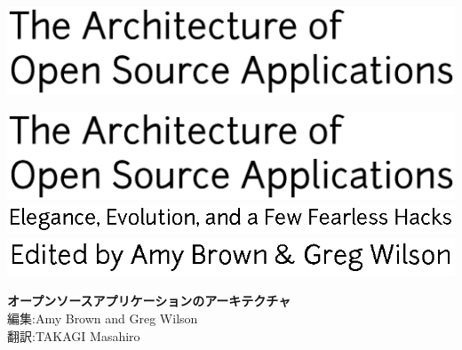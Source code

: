 \newpage

\thispagestyle{empty}
\hspace{-2cm}\includegraphics[width=400pt]{../images/frontmatter/title.eps} 

\newpage

\thispagestyle{empty}
\mbox{}    %

\newpage

\thispagestyle{empty}
\hspace{-2cm}\includegraphics[width=400pt]{../images/frontmatter/title.eps} 
\\
\vspace{0.5cm}
\hspace{2.8cm}\includegraphics{../images/frontmatter/subtitle.eps}
\\[13.5cm]
\vspace{0.5cm}
\hspace{6.5cm}\includegraphics{../images/frontmatter/eds.eps}

\newpage

\thispagestyle{empty}

\small
\noindent \textbf{オープンソースアプリケーションのアーキテクチャ} \\
編集:Amy Brown and Greg Wilson \\
翻訳:TAKAGI Masahiro

